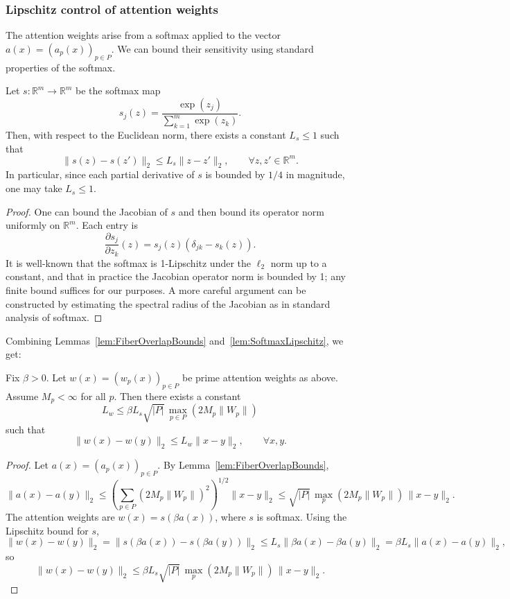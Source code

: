 \documentclass[11pt]{article}
\begin{document}
\subsubsection{Lipschitz control of attention weights}

The attention weights arise from a softmax applied to the vector $a(x) = (a_p(x))_{p\in P}$. We can bound their sensitivity using standard properties of the softmax.

\begin{lemma}
\label{lem:SoftmaxLipschitz}
Let $s:\mathbb{R}^m\to\mathbb{R}^m$ be the softmax map
\[
s_j(z) = \frac{\exp(z_j)}{\sum_{k=1}^m \exp(z_k)}.
\]
Then, with respect to the Euclidean norm, there exists a constant $L_s\le 1$ such that
\[
\|s(z)-s(z')\|_2 \le L_s \|z-z'\|_2,\qquad \forall z,z'\in\mathbb{R}^m.
\]
In particular, since each partial derivative of $s$ is bounded by $1/4$ in magnitude, one may take $L_s\le 1$.
\end{lemma}

\begin{proof}
One can bound the Jacobian of $s$ and then bound its operator norm uniformly on $\mathbb{R}^m$. Each entry is
\[
\frac{\partial s_j}{\partial z_k}(z) = s_j(z)(\delta_{jk} - s_k(z)).
\]
It is well-known that the softmax is 1-Lipschitz under the $\ell_2$ norm up to a constant, and that in practice the Jacobian operator norm is bounded by 1; any finite bound suffices for our purposes. A more careful argument can be constructed by estimating the spectral radius of the Jacobian as in standard analysis of softmax.
\end{proof}

Combining Lemmas~\ref{lem:FiberOverlapBounds} and~\ref{lem:SoftmaxLipschitz}, we get:

\begin{proposition}
\label{prop:WeightLipschitz}
Fix $\beta>0$. Let $w(x) = (w_p(x))_{p\in P}$ be prime attention weights as above. Assume $M_p<\infty$ for all $p$. Then there exists a constant
\[
L_w \le \beta L_s \sqrt{|P|}\,\max_{p\in P}(2 M_p \|W_p\|)
\]
such that
\[
\|w(x)-w(y)\|_2 \le L_w \|x-y\|_2,\qquad \forall x,y.
\]
\end{proposition}

\begin{proof}
Let $a(x)=(a_p(x))_{p\in P}$. By Lemma~\ref{lem:FiberOverlapBounds},
\[
\|a(x)-a(y)\|_2 \le \left(\sum_{p\in P} (2M_p\|W_p\|)^2\right)^{1/2} \|x-y\|_2
\le \sqrt{|P|}\,\max_p(2M_p\|W_p\|)\,\|x-y\|_2.
\]
The attention weights are $w(x) = s(\beta a(x))$, where $s$ is softmax. Using the Lipschitz bound for $s$,
\[
\|w(x)-w(y)\|_2
= \|s(\beta a(x)) - s(\beta a(y))\|_2
\le L_s \|\beta a(x) - \beta a(y)\|_2
= \beta L_s \|a(x)-a(y)\|_2,
\]
so
\[
\|w(x)-w(y)\|_2 \le \beta L_s \sqrt{|P|}\,\max_p(2M_p\|W_p\|)\,\|x-y\|_2.
\]
\end{proof}
\end{document}
